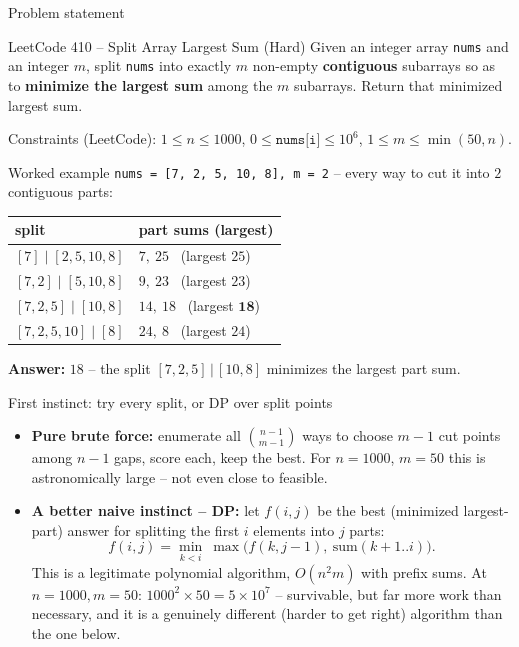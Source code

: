 \documentclass[11pt,aspectratio=169]{beamer}
\begin{document}
\begin{frame}{Problem statement}
  \begin{block}{LeetCode 410 -- Split Array Largest Sum (\textcolor{red!60!black}{Hard})}
    Given an integer array \texttt{nums} and an integer $m$, split \texttt{nums} into
    exactly $m$ non-empty \textbf{contiguous} subarrays so as to \textbf{minimize the
    largest sum} among the $m$ subarrays. Return that minimized largest sum.
  \end{block}
  Constraints (LeetCode): $1 \le n \le 1000$, $0 \le \texttt{nums[i]} \le 10^6$,
  $1 \le m \le \min(50, n)$.
\end{frame}

\begin{frame}{Worked example}
  \texttt{nums = [7, 2, 5, 10, 8], m = 2} -- every way to cut it into $2$ contiguous parts:
  \begin{center}
  \begin{tabular}{@{}ll@{}}
    \toprule
    split & part sums (largest) \\
    \midrule
    $[7] \mid [2,5,10,8]$ & $7,\ 25$ \ (largest $25$) \\
    $[7,2] \mid [5,10,8]$ & $9,\ 23$ \ (largest $23$) \\
    $[7,2,5] \mid [10,8]$ & $14,\ 18$ \ (largest $\mathbf{18}$) \\
    $[7,2,5,10] \mid [8]$ & $24,\ 8$ \ (largest $24$) \\
    \bottomrule
  \end{tabular}
  \end{center}
  \textbf{Answer:} $18$ -- the split $[7,2,5]\,|\,[10,8]$ minimizes the largest part sum.
\end{frame}

\begin{frame}{First instinct: try every split, or DP over split points}
  \begin{itemize}
    \item \textbf{Pure brute force:} enumerate all $\binom{n-1}{m-1}$ ways to choose $m-1$
    cut points among $n-1$ gaps, score each, keep the best. For $n=1000$, $m=50$ this is
    astronomically large -- not even close to feasible.
    \item \textbf{A better naive instinct -- DP:} let $f(i,j)$ be the best (minimized
    largest-part) answer for splitting the first $i$ elements into $j$ parts:
    \[
      f(i,j) = \min_{k<i}\ \max\big(f(k,j-1),\ \text{sum}(k{+}1..i)\big).
    \]
    This is a legitimate polynomial algorithm, $O(n^2 m)$ with prefix sums. At
    $n{=}1000, m{=}50$: $1000^2 \times 50 = 5\times 10^7$ -- survivable, but far more
    work than necessary, and it is a genuinely different (harder to get right) algorithm
    than the one below.
  \end{itemize}
\end{frame}
\end{document}
